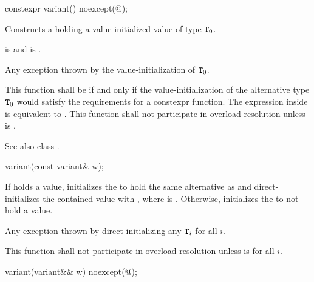 %
\begin{itemdecl}
constexpr variant() noexcept(@\seebelow@);
\end{itemdecl}

\begin{itemdescr}
\pnum
\effects
Constructs a  holding a value-initialized value of type $\texttt{T}_0$.

\pnum
\postconditions
{} is  and  is .

\pnum
\throws
Any exception thrown by the value-initialization of $\texttt{T}_0$.

\pnum
\remarks
This function shall be  if and only if the
value-initialization of the alternative type $\texttt{T}_0$ would satisfy the
requirements for a constexpr function.
The expression inside  is equivalent to
.
This function shall not participate in overload resolution unless
 is .
\begin{note} See also class . \end{note}
\end{itemdescr}

%
\begin{itemdecl}
variant(const variant& w);
\end{itemdecl}

\begin{itemdescr}
\pnum
\effects
If  holds a value, initializes the  to hold the same
alternative as  and direct-initializes the contained value
with , where  is .
Otherwise, initializes the  to not hold a value.

\pnum
\throws
Any exception thrown by direct-initializing any $\texttt{T}_i$ for all $i$.

\pnum
\remarks
This function shall not participate in overload resolution unless
 is  for all $i$.
\end{itemdescr}

%
\begin{itemdecl}
variant(variant&& w) noexcept(@\seebelow@);
\end{itemdecl}

